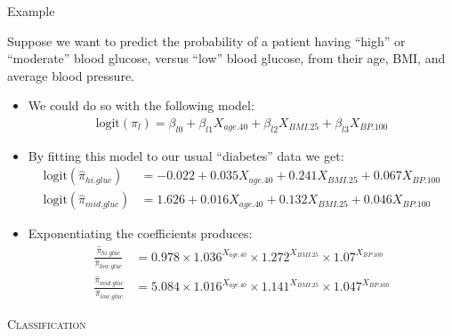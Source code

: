 \documentclass{beamer}\usepackage[]{graphicx}\usepackage[]{color}
\begin{document}
\begin{frame}{Example}



Suppose we want to predict the probability of a patient having ``high'' or 
``moderate'' blood glucose, versus ``low'' blood glucose, from their age, BMI, 
and average blood pressure.
\vc
\begin{itemize}
\item We could do so with the following model:
  \begin{align*}
    \text{logit}(\pi_l) = 
    \beta_{l0} + \beta_{l1} X_{age.40} + \beta_{l2} X_{BMI.25} + \beta_{l3} X_{BP.100}
  \end{align*}
\item By fitting this model to our usual ``diabetes'' data we get:
  \begin{align*}
    \text{logit}(\hat{\pi}_{hi.gluc}) &= 
    -0.022 + 0.035 X_{age.40} + 0.241 X_{BMI.25} + 
    0.067 X_{BP.100}\\[8pt]
    \text{logit}(\hat{\pi}_{mid.gluc}) &= 
    1.626 + 0.016 X_{age.40} + 0.132 X_{BMI.25} + 
    0.046 X_{BP.100}
  \end{align*}
\end{itemize}

\pagebreak

\begin{itemize}
\item Exponentiating the coefficients produces:
  \begin{align*}
    \frac{\hat{\pi}_{hi.gluc}}{\hat{\pi}_{low.gluc}} &= 
    0.978 \times 1.036^{X_{age.40}} \times 1.272^{X_{BMI.25}} 
    \times 1.07^{X_{BP.100}}\\[8pt]
    \frac{\hat{\pi}_{mid.gluc}}{\hat{\pi}_{low.gluc}} &= 
    5.084 \times 1.016^{X_{age.40}} \times 1.141^{X_{BMI.25}} 
    \times 1.047^{X_{BP.100}}
  \end{align*}
\end{itemize}

\end{frame}

  
\begin{frame}{}
  
  \begin{center}
    \Huge{\textsc{Classification}}
  \end{center}
  
\end{frame}
\end{document}
